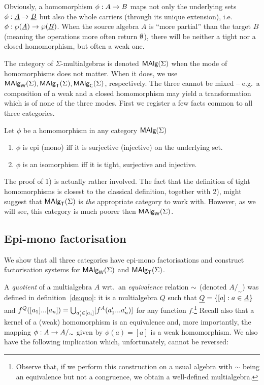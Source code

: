 \documentclass[10pt]{article}
\begin{document}
\noindent
Obviously, a homomorphism $\phi:A\rightarrow B$ maps not only the underlying
sets $\phi:\underline {A}\rightarrow \underline {B}$ but also the whole carriers
(through its unique extension), i.e.\  $\phi:\wp(\underline {A})\rightarrow\wp(\underline {B})$.  When the source algebra $A$ is ``more partial'' than
the target $B$ (meaning the operations more often return $\emptyset$), there
will be neither a tight nor a closed homomorphism, but often a weak
one.

The category of $\Sigma$-multialgebras is denoted $\mbox{\rm\sf MAlg}(\Sigma)$ when the mode
of homomorphisms does not matter. When it does, we use $\mbox{\rm\sf MAlg}_{\sf W}(\Sigma), \mbox{\rm\sf MAlg}_{\sf T}(\Sigma),
\mbox{\rm\sf MAlg}_{\sf C}(\Sigma)$, respectively. The three cannot be mixed 
-- e.g.\ a composition of a weak and a closed
homomorphism may yield a transformation which is of none of the three
modes.
First we register a few facts common to all three categories.
%
\begin{Prop}
\label{fa:epimono}\label{le:isotight}
Let $\phi$ be a homomorphism in any category $\mbox{\rm\sf MAlg}(\Sigma)$
\begin{enumerate}\MyLPar
\item $\phi$ is epi (mono) iff it
is surjective (injective) on the underlying set. 
\item $\phi$ is an isomorphism iff it is tight,
surjective and injective.
\end{enumerate}
\end{Prop}

\noindent
The proof of 1) is actually rather involved.
The fact that the definition of tight homomorphisms is closest to the classical
definition, together with 2), might suggest 
 that $\mbox{\rm\sf MAlg}_{\sf T}(\Sigma)$ is {\em the} appropriate category to work with. 
However, as we will see, this category is much poorer then $\mbox{\rm\sf MAlg}_{\sf W}(\Sigma)$.

\subsection{Epi-mono factorisation}

We show that all three categories have
epi-mono factorisations and construct factorisation systems for
$\mbox{\rm\sf MAlg}_{\sf W}(\Sigma)$ and $\mbox{\rm\sf MAlg}_{\sf T}(\Sigma)$.

A {\em quotient\/} of a multialgebra $A$ wrt.\ an {\em equivalence}
relation $\sim$ (denoted $A/_\sim$) was defined in
definition~\ref{de:quo}: it is a multialgebra $Q$ such that $\underline {Q}
= \{ [a] : a \in \underline {A} \}$ and $f^Q([a_{1}]...[a_{n}]) =
\bigcup_{a'_i \in [a_i]} [f^A(a'_{1}...a'_{n})]$ for any function
$f$.\footnote{Observe that, if we perform this construction on a usual
algebra with $\sim$ being an equivalence but not a congruence, we
obtain a well-defined multialgebra.}
Recall also that a kernel of a (weak) homomorphism is an equivalence
and, more importantly, the mapping $\phi: A \rightarrow A/_\sim$ given by
$\phi(a) = [a]$ is a weak homomorphism. We also have the following
implication which, unfortunately, cannot be reversed:
\end{document}
